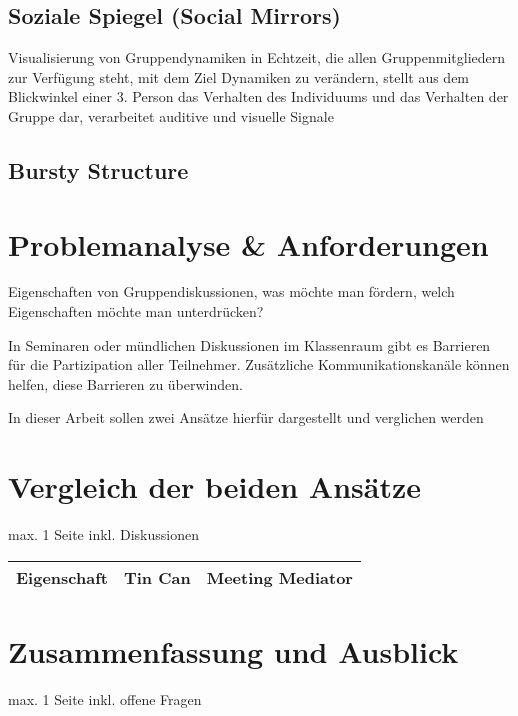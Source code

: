 \documentclass{seminarvorlage}
\begin{document}
\subsection{Soziale Spiegel (Social Mirrors)}
Visualisierung von Gruppendynamiken in Echtzeit, die allen Gruppenmitgliedern
zur Verfügung steht, mit dem Ziel Dynamiken zu verändern, stellt aus dem
Blickwinkel einer 3. Person das Verhalten des Individuums und das Verhalten der
Gruppe dar, verarbeitet auditive und visuelle Signale

\subsection{Bursty Structure}

\section{Problemanalyse \& Anforderungen}

 Eigenschaften von Gruppendiskussionen, was möchte man fördern, welch Eigenschaften möchte man unterdrücken?
 
 In Seminaren oder mündlichen Diskussionen im Klassenraum gibt es Barrieren für die Partizipation aller Teilnehmer. Zusätzliche Kommunikationskanäle können helfen, diese Barrieren zu überwinden.

In dieser Arbeit sollen zwei Ansätze hierfür dargestellt und verglichen werden






\section{Vergleich der beiden Ansätze}
max. 1 Seite
inkl. Diskussionen

\begin{tabular}{ l | l | l }
  Eigenschaft & Tin Can & Meeting Mediator \\
  \hline
\end{tabular}


\section{Zusammenfassung und Ausblick}
max. 1 Seite
inkl. offene Fragen
% 
\end{document}
